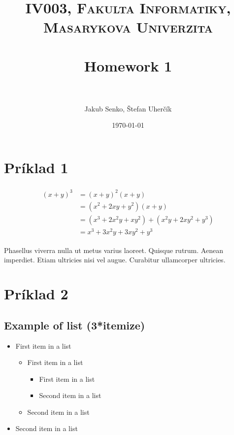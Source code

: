 \documentclass[paper=a4, fontsize=11pt]{scrartcl} %
\title{	
\normalfont \normalsize 
\textsc{IV003, Fakulta Informatiky, Masarykova Univerzita} \\ [25pt] %
\horrule{0.5pt} \\[0.4cm] %
\huge Homework 1 \\ %
\horrule{2pt} \\[0.5cm] %
}
\author{Jakub Senko, Štefan Uherčík} %
\date{\normalsize\today} %
\numberwithin{equation}{section} %
\numberwithin{figure}{section} %
\numberwithin{table}{section} %
\begin{document}
\maketitle %


\section*{Príklad 1}

\lipsum[2] %

\begin{align} 
\begin{split}
(x+y)^3 	&= (x+y)^2(x+y)\\
&=(x^2+2xy+y^2)(x+y)\\
&=(x^3+2x^2y+xy^2) + (x^2y+2xy^2+y^3)\\
&=x^3+3x^2y+3xy^2+y^3
\end{split}					
\end{align}

Phasellus viverra nulla ut metus varius laoreet. Quisque rutrum. Aenean imperdiet. Etiam ultricies nisi vel augue. Curabitur ullamcorper ultricies.

\pagebreak

\section*{Príklad 2}

\subsection{Example of list (3*itemize)}
\begin{itemize}
	\item First item in a list 
		\begin{itemize}
		\item First item in a list 
			\begin{itemize}
			\item First item in a list 
			\item Second item in a list 
			\end{itemize}
		\item Second item in a list 
		\end{itemize}
	\item Second item in a list 
\end{itemize}
\end{document}
